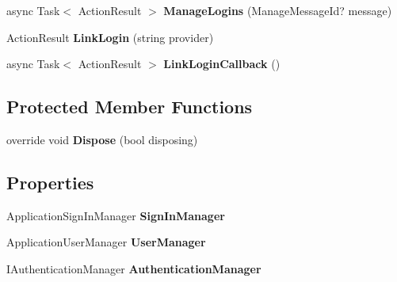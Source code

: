 \begin{DoxyCompactItemize}
async Task$<$ Action\+Result $>$ {\bfseries Manage\+Logins} (Manage\+Message\+Id? message)
\item 
\mbox{\label{class_alfa_accounting_1_1_controllers_1_1_manage_controller_a2957de1573aca6f0ebb20ae7863ecbae}} 
Action\+Result {\bfseries Link\+Login} (string provider)
\item 
\mbox{\label{class_alfa_accounting_1_1_controllers_1_1_manage_controller_ac4cab7a52e2c4b5782a9cd40abc11861}} 
async Task$<$ Action\+Result $>$ {\bfseries Link\+Login\+Callback} ()
\end{DoxyCompactItemize}
\subsection*{Protected Member Functions}
\begin{DoxyCompactItemize}
\item 
\mbox{\label{class_alfa_accounting_1_1_controllers_1_1_manage_controller_ad2f5eb6176ba3e84fca94bc29c920d5e}} 
override void {\bfseries Dispose} (bool disposing)
\end{DoxyCompactItemize}
\subsection*{Properties}
\begin{DoxyCompactItemize}
\item 
\mbox{\label{class_alfa_accounting_1_1_controllers_1_1_manage_controller_a31fe7778f155eb01068d86c5ce8c7704}} 
Application\+Sign\+In\+Manager {\bfseries Sign\+In\+Manager}
\item 
\mbox{\label{class_alfa_accounting_1_1_controllers_1_1_manage_controller_a6d00ab6b25367cc5bf01222a88e564a0}} 
Application\+User\+Manager {\bfseries User\+Manager}
\item 
\mbox{\label{class_alfa_accounting_1_1_controllers_1_1_manage_controller_ac374566f564308fb8fd33b41465cd9ce}} 
I\+Authentication\+Manager {\bfseries Authentication\+Manager}
\end{DoxyCompactItemize}
